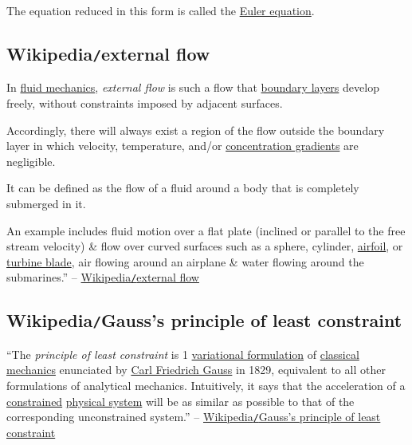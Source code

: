\documentclass{article}
\begin{document}
The equation reduced in this form is called the \href{https://en.wikipedia.org/wiki/Euler_equations_(fluid_dynamics)}{Euler equation}.


\subsection{Wikipedia{\tt/}external flow}
In \href{https://en.wikipedia.org/wiki/Fluid_mechanics}{fluid mechanics}, \textit{external flow} is such a flow that \href{https://en.wikipedia.org/wiki/Boundary_layer}{boundary layers} develop freely, without constraints imposed by adjacent surfaces.

Accordingly, there will always exist a region of the flow outside the boundary layer in which velocity, temperature, and/or \href{https://en.wikipedia.org/wiki/Concentration_gradient}{concentration gradients} are negligible.

It can be defined as the flow of a fluid around a body that is completely submerged in it.

%
An example includes fluid motion over a flat plate (inclined or parallel to the free stream velocity) \& flow over curved surfaces such as a sphere, cylinder, \href{https://en.wikipedia.org/wiki/Airfoil}{airfoil}, or \href{https://en.wikipedia.org/wiki/Turbine_blade}{turbine blade}, air flowing around an airplane \& water flowing around the submarines.'' -- \href{https://en.wikipedia.org/wiki/External_flow}{Wikipedia{\tt/}external flow}


\subsection{Wikipedia{\tt/}Gauss's principle of least constraint}
``The \textit{principle of least constraint} is 1 \href{https://en.wikipedia.org/wiki/Variational_principle}{variational formulation} of \href{https://en.wikipedia.org/wiki/Classical_mechanics}{classical mechanics} enunciated by \href{https://en.wikipedia.org/wiki/Carl_Friedrich_Gauss}{Carl Friedrich Gauss} in 1829, equivalent to all other formulations of analytical mechanics. Intuitively, it says that the acceleration of a \href{https://en.wikipedia.org/wiki/Constraint_(classical_mechanics)}{constrained} \href{https://en.wikipedia.org/wiki/Physical_system}{physical system} will be as similar as possible to that of the corresponding unconstrained system.'' -- \href{https://en.wikipedia.org/wiki/Gauss%27s_principle_of_least_constraint}{Wikipedia{\tt/}Gauss's principle of least constraint}
\end{document}
